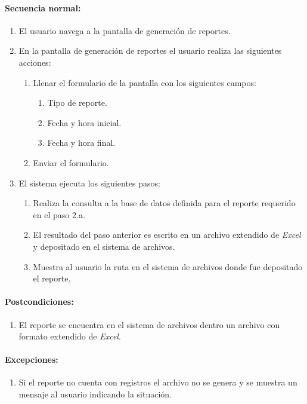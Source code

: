 \paragraph{Secuencia normal:}
\begin{enumerate}
  \item El usuario navega a la pantalla de generación de reportes.
  \item En la pantalla de generación de reportes el usuario realiza las siguientes acciones:
    \begin{enumerate}
    \item Llenar el formulario de la pantalla con los siguientes campos:
    \begin{enumerate}
      \item Tipo de reporte.
      \item Fecha y hora inicial.
      \item Fecha y hora final.
    \end{enumerate}
    \item Enviar el formulario.
  \end{enumerate}
  \item El sistema ejecuta los siguientes pasos:
  \begin{enumerate}
    \item Realiza la consulta a la base de datos definida para el reporte requerido en el paso 2.a.
    \item El resultado del paso anterior es escrito en un archivo extendido de \textit{Excel}\textsuperscript{\textcopyright} y depositado en el sistema de archivos.
    \item Muestra al usuario la ruta en el sistema de archivos donde fue depositado el reporte.
  \end{enumerate}
\end{enumerate}
\paragraph{Postcondiciones:}
\begin{enumerate}
  \item El reporte se encuentra en el sistema de archivos dentro un archivo con formato extendido de \textit{Excel}\textsuperscript{\textcopyright}.
\end{enumerate}
\paragraph{Excepciones:}
\begin{enumerate}
  \item Si el reporte no cuenta con registros el archivo no se genera y se muestra un mensaje al usuario indicando la situación.
\end{enumerate}


